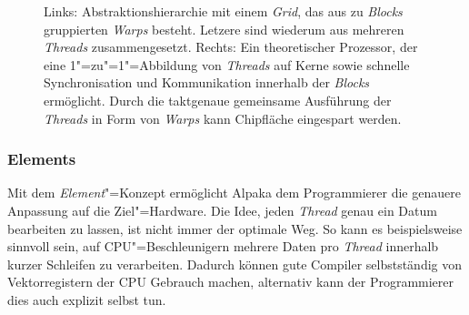 \begin{figure}
    \caption{Links: Abstraktionshierarchie mit einem \textit{Grid}, das aus
             zu \textit{Blocks} gruppierten \textit{Warps} besteht. Letzere sind
             wiederum aus mehreren \textit{Threads} zusammengesetzt.
             Rechts: Ein theoretischer Prozessor, der eine 1"=zu"=1"=Abbildung
             von \textit{Threads} auf Kerne sowie schnelle Synchronisation und
             Kommunikation innerhalb der \textit{Blocks} ermöglicht. Durch die
             taktgenaue gemeinsame Ausführung der \textit{Threads} in Form von
             \textit{Warps} kann Chipfläche eingespart werden.
             \cite[nach][20]{worpitz2015}}
    \label{alpaka:konzepte:abstraktion:warps:warphw}
\end{figure}

\subsubsection{Elements}

Mit dem \textit{Element}"=Konzept ermöglicht Alpaka dem Programmierer die
genauere Anpassung auf die Ziel"=Hardware. Die Idee, jeden \textit{Thread} genau
ein Datum bearbeiten zu lassen, ist nicht immer der optimale Weg. So kann es
beispielsweise sinnvoll sein, auf CPU"=Beschleunigern mehrere Daten pro
\textit{Thread} innerhalb kurzer Schleifen zu verarbeiten. Dadurch können gute
Compiler selbstständig von Vektorregistern der CPU Gebrauch machen, alternativ
kann der Programmierer dies auch explizit selbst tun.

